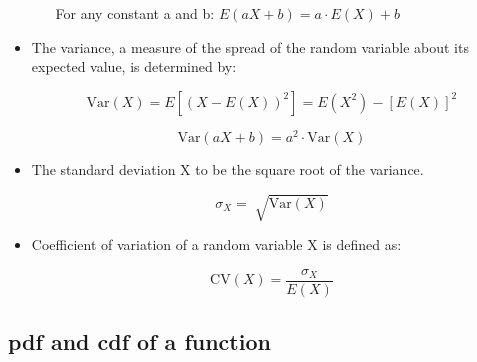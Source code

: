 \documentclass[12pt]{report}
\renewcommand{\_}{\kern-1.5pt\textunderscore\kern-1.5pt}
\begin{document}
\begin{itemize}
\begin{itemize}
For any constant a and b:  \( E \left( aX+b \right) =a \cdot E \left( X \right) +b \) \par


\end{itemize}
	\item The variance, a measure of the spread of the random variable about its expected value, is determined by:\par

 \[ \mathrm{Var} \left( X \right) =E \left[  \left( X-E \left( X \right)  \right) ^{2} \right] =E \left( X^{2} \right) - \left[ E \left( X \right)  \right] ^{2} \] \par

 \[ \mathrm{Var} \left( aX+b \right) =a^{2} \cdot \mathrm{Var} \left( X \right)  \] \par

	\item The standard deviation X to be the square root of the variance.\par

 \[  \sigma _{X}\mathrm{=}\sqrt[]{\mathrm{Var} \left( X \right) } \] \par

	\item Coefficient of variation of a random variable X is defined as:\par

 \[ \mathrm{CV} \left( X \right) =\frac{ \sigma _{X}}{E \left( X \right) } \] \par


\end{itemize}\subsection*{pdf and cdf of a function}
\end{document}
